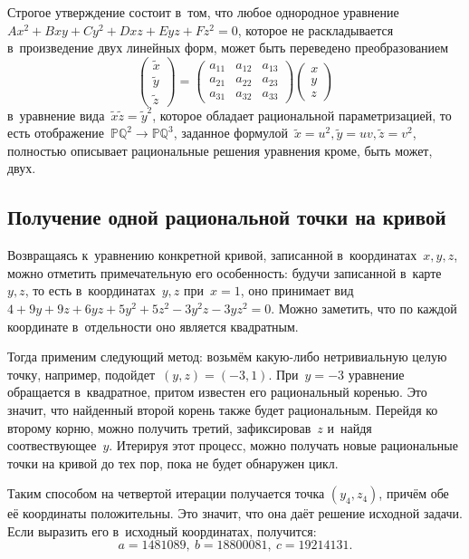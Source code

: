 \documentclass{article}
\begin{document}
Строгое утверждение состоит в~том, что любое однородное уравнение $Ax^2 + Bxy +
Cy^2 + Dxz + Eyz + Fz^2 = 0$, которое не раскладывается в~произведение двух
линейных форм, может быть переведено преобразованием
\[
  \left( \begin{array}{c} \widetilde{x}\\ \widetilde{y}\\ \widetilde{z}
  \end{array} \right) = \left( \begin{array}{ccc} a_{11} & a_{12} & a_{13}\\
  a_{21} & a_{22} & a_{23} \\ a_{31} & a_{32} & a_{33} \end{array} \right)
  \left( \begin{array}{c} x\\y\\z\end{array} \right)
  \] в~уравнение вида~$\widetilde{x}\widetilde{z} = \widetilde{y}^2$, которое
обладает рациональной параметризацией, то есть отображение~$\mathbb{PQ}^2
\rightarrow \mathbb{PQ}^3$, заданное формулой~$\widetilde{x} = u^2,
\widetilde{y} = uv, \widetilde{z} = v^2$, полностью описывает рациональные
решения уравнения кроме, быть может, двух.

\subsection{Получение одной рациональной точки на кривой}

Возвращаясь к~уравнению конкретной кривой, записанной в~координатах~$x, y, z$,
можно отметить примечательную его особенность: будучи записанной в~карте~$y, z$,
то есть в~координатах~$y, z$ при~$x = 1$, оно принимает вид $4 + 9y + 9z + 6yz +
5y^2 + 5z^2 - 3y^2z - 3yz^2 = 0$. Можно заметить, что по каждой координате
в~отдельности оно является квадратным.

Тогда применим следующий метод: возьмём какую-либо нетривиальную целую точку,
например, подойдет~$(y, z) = (-3, 1)$. При~$y = -3$ уравнение обращается
в~квадратное, притом известен его рациональный коренью. Это значит, что
найденный второй корень также будет рациональным. Перейдя ко второму корню,
можно получить третий, зафиксировав~$z$ и~найдя соотвествующее~$y$. Итерируя
этот процесс, можно получать новые рациональные точки на кривой до тех пор, пока
не будет обнаружен цикл.

Таким способом на четвертой итерации получается точка $(y_4, z_4)$, причём обе
её координаты положительны. Это значит, что она даёт решение исходной задачи.
Если выразить его в~исходный координатах, получится:
$$ a = 1481089,\ b = 18800081,\ c = 19214131. $$
\end{document}
